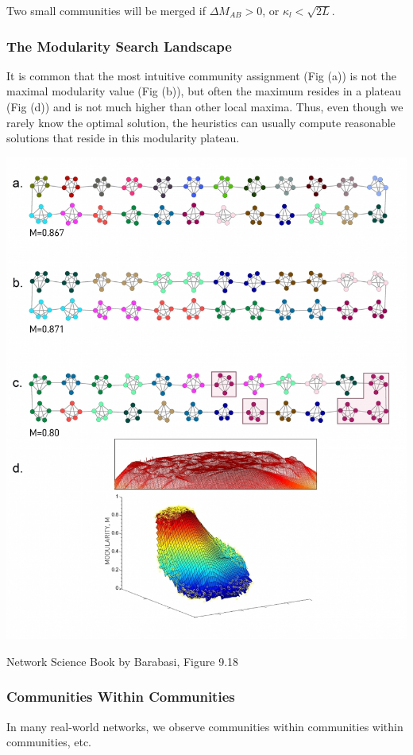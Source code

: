 \documentclass[11pt]{scrartcl} %
\begin{document}
Two small communities will be merged if $\Delta M_{AB} > 0$, or $\kappa_l < \sqrt{2L}$.

\subsubsection{The Modularity Search Landscape}
It is common that the most intuitive community assignment (Fig (a)) is not the maximal modularity value (Fig (b)), but often the maximum resides in a plateau (Fig (d)) and is not much higher than other local maxima. Thus, even though we rarely know the optimal solution, the heuristics can usually compute reasonable solutions that reside in this modularity plateau.

\begin{center}
\includegraphics[width=0.9\linewidth]{img/L7.3-ModularitySearchLandscape.jpg}

{\tiny Network Science Book by Barabasi, Figure 9.18}
\end{center}

\subsubsection{Communities Within Communities}
In many real-world networks, we observe communities within communities within communities, etc.
\end{document}
